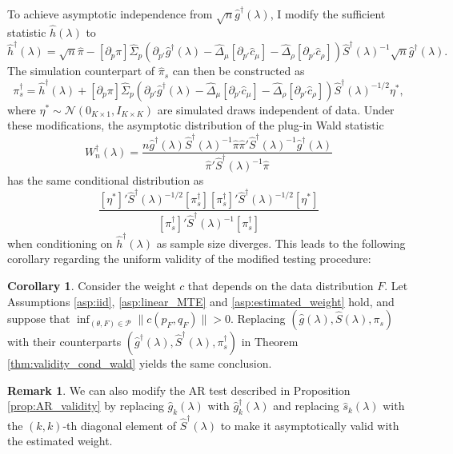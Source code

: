 \documentclass[11pt]{article}
\theoremstyle{definition}
\newtheorem{corollary}{Corollary}[section]
\newtheorem{remark}{Remark}[section]
\newcommand{\0}{\ensuremath{\mathbf{0}}}
\newcommand{\normal}{\ensuremath{\mathcal{N}}}
\begin{document}
\begin{bibunit}
To achieve asymptotic independence from $\sqrt{n}\hat{g}^\dagger(\lambda)$, I modify the sufficient statistic $\hat{h}(\lambda)$ to
\[
    \hat{h}^\dagger(\lambda) = \sqrt{n}\hat{\pi} - [\partial_{p} {\pi}]\hat{\Sigma}_p \left(\partial_{p'} \hat{g}^\dagger(\lambda) - \hat{\Delta}_\mu [\partial_{p'} \hat{c}_\mu] - \hat{\Delta}_\rho [\partial_{p'} \hat{c}_\rho]\right) \hat{S}^\dagger(\lambda)^{-1}\sqrt{n}\hat{g}^\dagger(\lambda).
\]
The simulation counterpart of $\hat{\pi}_s$ can then be constructed as
\[
    {\pi}_s^\dagger = \hat{h}^\dagger(\lambda) + [\partial_{p} {\pi}]\hat{\Sigma}_p \left(\partial_{p'} \hat{g}^\dagger(\lambda) - \hat{\Delta}_\mu [\partial_{p'} \hat{c}_\mu] - \hat{\Delta}_\rho [\partial_{p'} \hat{c}_\rho]\right) \hat{S}^\dagger(\lambda)^{-1/2}\eta^*,
\]
where $\eta^* \sim \normal(0_{K\times 1},I_{K\times K})$ are simulated draws independent of data.
Under these modifications, the asymptotic distribution of the plug-in Wald statistic
\[
    W_n^\dagger(\lambda) = \frac{n\hat{g}^\dagger(\lambda)\hat{S}^\dagger(\lambda)^{-1}\hat{\pi}\hat{\pi}'\hat{S}^\dagger(\lambda)^{-1}\hat{g}^\dagger(\lambda)}{\hat{\pi}'\hat{S}^\dagger(\lambda)^{-1}\hat{\pi}}
\]
has the same conditional distribution as
\[
    \frac{[\eta^*]' \hat{S}^\dagger(\lambda)^{-1/2} [\pi_s^\dagger] [\pi_s^\dagger]' \hat{S}^\dagger(\lambda)^{-1/2} [\eta^*]}{[\pi_s^\dagger]'\hat{S}^\dagger(\lambda)^{-1}[\pi_s^\dagger]}
\]
when conditioning on $\hat{h}^\dagger(\lambda)$ as sample size diverges. This leads to the following corollary regarding the uniform validity of the modified testing procedure:
\begin{corollary}
\label{corollary:linear_MTE_estimated_weight}
    Consider the weight $c$ that depends on the data distribution $F$. Let Assumptions \ref{asp:iid}, \ref{asp:linear_MTE} and \ref{asp:estimated_weight} hold, and suppose that $\inf_{(\theta, F)\in\mathcal{P}} \|c(p_F,q_F)\| > 0$. Replacing $(\hat{g}(\lambda), \hat{S}(\lambda), \pi_s)$ with their counterparts $(\hat{g}^\dagger(\lambda), \hat{S}^\dagger(\lambda), \pi^\dagger_s)$ in Theorem \ref{thm:validity_cond_wald} yields the same conclusion.
\end{corollary}

\begin{remark}
    We can also modify the AR test described in Proposition \ref{prop:AR_validity} by replacing $\hat{g}_k(\lambda)$ with $\hat{g}_k^\dagger(\lambda)$ and replacing $\hat{s}_k(\lambda)$ with the $(k,k)$-th diagonal element of $\hat{S}^\dagger(\lambda)$ to make it asymptotically valid with the estimated weight.
\end{remark}


\end{bibunit}
\end{document}
